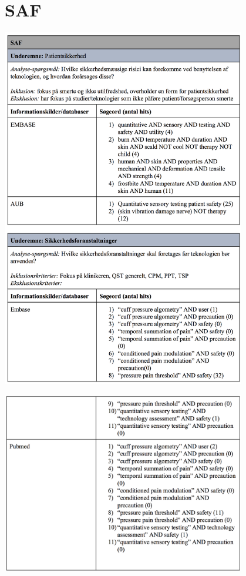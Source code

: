 \section{SAF}\label{SAF_sog}
\begin{center}
\includegraphics[width=0.8\textwidth]{rapportAfsnit/qBilag/sogninger/SAF1}

\includegraphics[width=0.8\textwidth]{rapportAfsnit/qBilag/sogninger/SAF2}
\end{center}

